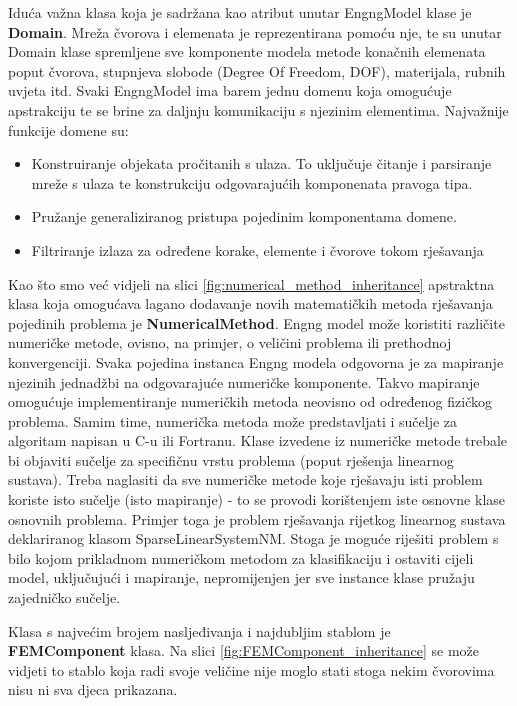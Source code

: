 \documentclass[a4paper,twoside,12pt]{memoir} %
\begin{document}
\par
Iduća važna klasa koja je sadržana kao atribut unutar EngngModel klase je \textbf{Domain}. Mreža čvorova i elemenata je reprezentirana pomoću nje, te su unutar Domain klase spremljene sve komponente modela metode konačnih elemenata poput čvorova, stupnjeva slobode (Degree Of Freedom, DOF), materijala, rubnih uvjeta itd. Svaki EngngModel ima barem jednu domenu koja omogućuje apstrakciju te se brine za daljnju komunikaciju s njezinim elementima. Najvažnije funkcije domene su:
\begin{itemize}
    \label{text:domain}
    \item Konstruiranje objekata pročitanih s ulaza. To uključuje čitanje i parsiranje mreže s ulaza te konstrukciju odgovarajućih komponenata pravoga tipa.
    \item Pružanje generaliziranog pristupa pojedinim komponentama domene.
    \item Filtriranje izlaza za određene korake, elemente i čvorove tokom rješavanja
\end{itemize}

\par

Kao što smo već vidjeli na slici \ref{fig:numerical_method_inheritance} apstraktna klasa koja omogućava lagano dodavanje novih matematičkih metoda rješavanja pojedinih problema je \textbf{NumericalMethod}. Engng model može koristiti različite numeričke metode, ovisno, na primjer, o veličini problema ili prethodnoj konvergenciji. Svaka pojedina instanca Engng modela odgovorna je za mapiranje njezinih jednadžbi na odgovarajuće numeričke komponente. Takvo mapiranje omogućuje implementiranje numeričkih metoda neovisno od određenog fizičkog problema. Samim time, numerička metoda može predstavljati i sučelje za algoritam napisan u C-u ili Fortranu. Klase izvedene iz numeričke metode trebale bi objaviti sučelje za specifičnu vrstu problema (poput rješenja linearnog sustava). Treba naglasiti da sve numeričke metode koje rješavaju isti problem koriste isto sučelje (isto mapiranje) - to se provodi korištenjem iste osnovne klase osnovnih problema. Primjer toga je problem rješavanja rijetkog linearnog sustava deklariranog klasom SparseLinearSystemNM. Stoga je moguće riješiti problem s bilo kojom prikladnom numeričkom metodom za klasifikaciju i ostaviti cijeli model, uključujući i mapiranje, nepromijenjen jer sve instance klase pružaju zajedničko sučelje. \par

Klasa s najvećim brojem nasljeđivanja i najdubljim stablom je \textbf{FEMComponent} klasa. Na slici \ref{fig:FEMComponent_inheritance} se može vidjeti to stablo koja radi svoje veličine nije moglo stati stoga nekim čvorovima nisu ni sva djeca prikazana.
\end{document}

